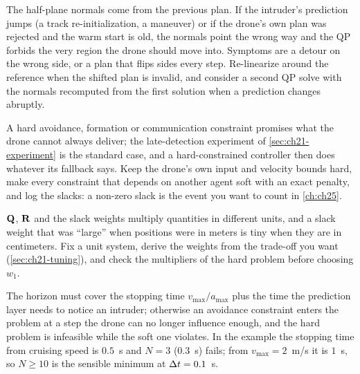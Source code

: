 \begin{pitfall}
The half-plane normals come from the previous plan. If the intruder's
prediction jumps (a track re-initialization, a maneuver) or if the drone's own
plan was rejected and the warm start is old, the normals point the wrong way
and the QP forbids the very region the drone should move into. Symptoms are a
detour on the wrong side, or a plan that flips sides every step. Re-linearize
around the reference when the shifted plan is invalid, and consider a second
QP solve with the normals recomputed from the first solution when a
prediction changes abruptly.
\end{pitfall}

\begin{pitfall}
A hard avoidance, formation or communication constraint promises what the
drone cannot always deliver; the late-detection experiment of
\cref{sec:ch21-experiment} is the standard case, and a hard-constrained
controller then does whatever its fallback says. Keep the drone's own input and velocity bounds hard, make every
constraint that depends on another agent soft with an exact penalty, and log
the slacks: a non-zero slack is the event you want to count in
\cref{ch:ch25}.
\end{pitfall}

\begin{pitfall}
$\mathbf{Q}$, $\mathbf{R}$ and the slack weights multiply quantities in different
units, and a slack weight that was ``large'' when positions were in meters is
tiny when they are in centimeters. Fix a unit system, derive the weights from
the trade-off you want (\cref{sec:ch21-tuning}), and check the multipliers of
the hard problem before choosing $w_1$.
\end{pitfall}

\begin{pitfall}
The horizon must cover the stopping time $v_{\max}/a_{\max}$ plus the time the
prediction layer needs to notice an intruder; otherwise an avoidance
constraint enters the problem at a step the drone can no longer influence
enough, and the hard problem is infeasible while the soft one violates. In
the example the stopping time from cruising speed is $0.5$~s and $N=3$
($0.3$~s) fails; from $v_{\max}=2$~m/s it is $1$~s, so $N\ge10$ is the
sensible minimum at $\Delta t=0.1$~s.
\end{pitfall}

